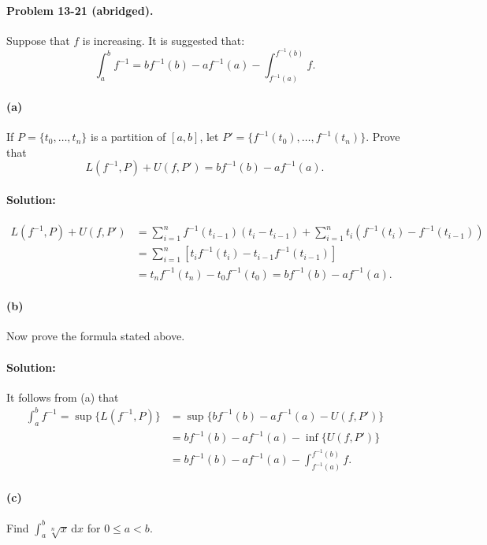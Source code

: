 \documentclass{article}
\begin{document}
\paragraph{Problem 13-21 (abridged).} Suppose that $f$ is increasing. It is
suggested that: \begin{equation*}
  \int_a^b f^{-1} = bf^{-1}(b) - af^{-1}(a) - \int_{f^{-1}(a)}^{f^{-1}(b)} f.
\end{equation*}

\paragraph{(a)} If $P = \{t_0, \ldots, t_n\}$ is a partition of $[a, b]$, let
$P' = \{f^{-1}(t_0), \ldots, f^{-1}(t_n)\}$. Prove that \begin{equation*}
  L(f^{-1}, P) + U(f, P') = bf^{-1}(b) - af^{-1}(a).
\end{equation*}

\paragraph{Solution:} \begin{align*}
  L(f^{-1}, P) + U(f, P')
    &= \sum_{i = 1}^n f^{-1}(t_{i - 1})(t_i - t_{i - 1}) +
      \sum_{i = 1}^n t_i(f^{-1}(t_i) - f^{-1}(t_{i - 1})) \\
    &= \sum_{i = 1}^n [t_if^{-1}(t_i) - t_{i - 1}f^{-1}(t_{i - 1})] \\
    &= t_nf^{-1}(t_n) - t_0f^{-1}(t_0) = bf^{-1}(b) - af^{-1}(a).
\end{align*}

\paragraph{(b)} Now prove the formula stated above.

\paragraph{Solution:} It follows from (a) that \begin{align*}
  \int_a^b f^{-1} = \sup\{L(f^{-1}, P)\}
    &= \sup\{bf^{-1}(b) - af^{-1}(a) - U(f, P')\} \\
    &= bf^{-1}(b) - af^{-1}(a) - \inf\{U(f, P')\} \\
    &= bf^{-1}(b) - af^{-1}(a) - \int_{f^{-1}(a)}^{f^{-1}(b)} f.
\end{align*}

\paragraph{(c)} Find $\int_a^b \sqrt[n]{x} \,\mathrm{d}x$ for $0 \leq a < b$.
\end{document}
